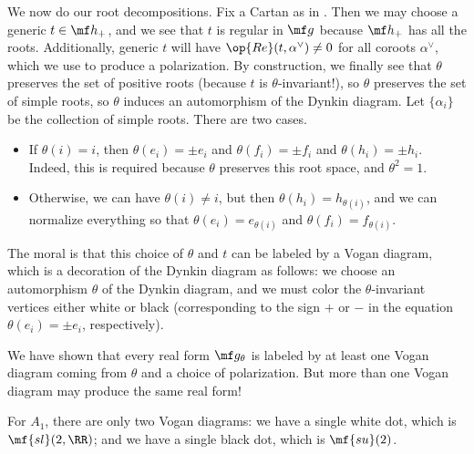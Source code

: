 \documentclass[../notes.tex]{subfiles}
\begin{document}
We now do our root decompositions. Fix a Cartan as in . Then we may choose a generic $t\in\mf h_+$, and we see that $t$ is regular in $\mf g$ because $\mf h_+$ has all the roots. Additionally, generic $t$ will have $\op{Re}(t,\alpha^\lor)\ne0$ for all coroots $\alpha^\lor$, which we use to produce a polarization. By construction, we finally see that $\theta$ preserves the set of positive roots (because $t$ is $\theta$-invariant!), so $\theta$ preserves the set of simple roots, so $\theta$ induces an automorphism of the Dynkin diagram. Let $\{\alpha_i\}$ be the collection of simple roots. There are two cases.
\begin{itemize}
	\item If $\theta(i)=i$, then $\theta(e_i)=\pm e_i$ and $\theta(f_i)=\pm f_i$ and $\theta(h_i)=\pm h_i$. Indeed, this is required because $\theta$ preserves this root space, and $\theta^2=1$.
	\item Otherwise, we can have $\theta(i)\ne i$, but then $\theta(h_i)=h_{\theta(i)}$, and we can normalize everything so that $\theta(e_i)=e_{\theta(i)}$ and $\theta(f_i)=f_{\theta(i)}$.
\end{itemize}
The moral is that this choice of $\theta$ and $t$ can be labeled by a Vogan diagram, which is a decoration of the Dynkin diagram as follows: we choose an automorphism $\theta$ of the Dynkin diagram, and we must color the $\theta$-invariant vertices either white or black (corresponding to the sign $+$ or $-$ in the equation $\theta(e_i)=\pm e_i$, respectively).
\begin{remark}
	We have shown that every real form $\mf g_\theta$ is labeled by at least one Vogan diagram coming from $\theta$ and a choice of polarization. But more than one Vogan diagram may produce the same real form!
\end{remark}
\begin{example}
	For $A_1$, there are only two Vogan diagrams: we have a single white dot, which is $\mf{sl}(2,\RR)$; and we have a single black dot, which is $\mf{su}(2)$.
\end{example}
\end{document}
